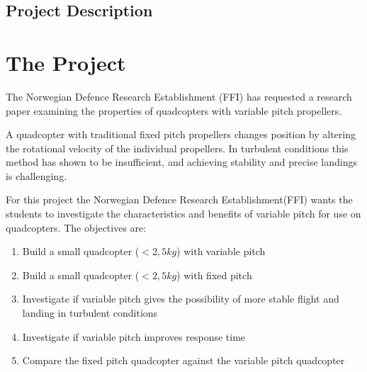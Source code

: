 \chapter*{Project Description}
\Hide 
\part{The Project}
\label{sec:project}
The Norwegian Defence Research Establishment (FFI) has requested a research paper examining the properties of quadcopters with variable pitch propellers.\bigskip

A quadcopter with traditional fixed pitch propellers changes position by altering the rotational velocity of the individual propellers. In turbulent conditions this method has shown to be insufficient, and achieving stability and precise landings is challenging.\bigskip



For this project the Norwegian Defence Research Establishment(FFI) wants the students to investigate the characteristics and benefits of variable pitch for use on quadcopters. The objectives are:
\begin{enumerate}
    \item Build a small quadcopter ($<2,5 kg$) with variable pitch
    \item Build a small quadcopter ($<2,5 kg$) with fixed pitch
    \item Investigate if variable pitch gives the possibility of more stable flight and landing in turbulent conditions
    \item Investigate if variable pitch improves response time
    \item Compare the fixed pitch quadcopter against the variable pitch quadcopter
\end{enumerate}

